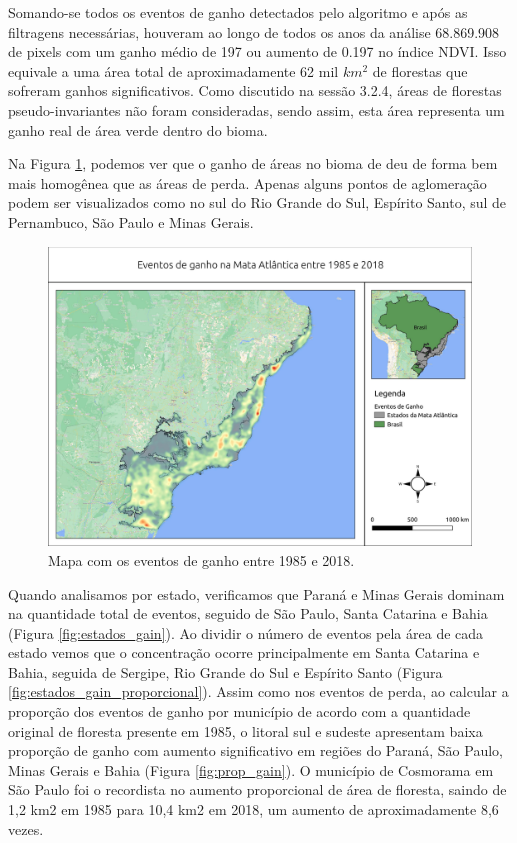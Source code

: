 \hspace{13pt} Somando-se todos os eventos de ganho detectados pelo algoritmo e após as filtragens necessárias, houveram ao longo de todos os anos da análise 68.869.908 de pixels com um ganho médio de 197 ou aumento de 0.197 no índice NDVI. Isso equivale a uma área total de aproximadamente 62 mil $ km^2 $ de florestas que sofreram ganhos significativos. Como discutido na sessão 3.2.4, áreas de florestas pseudo-invariantes não foram consideradas, sendo assim, esta área representa um ganho real de área verde dentro do bioma. 

Na Figura \ref{fig:heat_gain}, podemos ver que o ganho de áreas no bioma de deu de forma bem mais homogênea que as áreas de perda. Apenas alguns pontos de aglomeração podem ser visualizados como no sul do Rio Grande do Sul, Espírito Santo, sul de Pernambuco, São Paulo e Minas Gerais.

\begin{figure}[H]
    \centering
    \includegraphics[scale=.5]{images/heatmap_gain_masked18_dur_gt4_inv_for.pdf}
    \caption{Mapa com os eventos de ganho entre 1985 e 2018.}
    \label{fig:heat_gain}
\end{figure}

Quando analisamos por estado, verificamos que Paraná e Minas Gerais dominam na quantidade total de eventos, seguido de São Paulo, Santa Catarina e Bahia (Figura \ref{fig:estados_gain}). Ao dividir o número de eventos pela área de cada estado vemos que o concentração ocorre principalmente em Santa Catarina e Bahia, seguida de Sergipe, Rio Grande do Sul e Espírito Santo (Figura \ref{fig:estados_gain_proporcional}). Assim como nos eventos de perda, ao calcular a proporção dos eventos de ganho por município de acordo com a quantidade original de floresta presente em 1985, o litoral sul e sudeste apresentam baixa proporção de ganho com aumento significativo em regiões do Paraná, São Paulo, Minas Gerais e Bahia (Figura \ref{fig:prop_gain}). O município de Cosmorama em São Paulo foi o recordista no aumento proporcional de área de floresta, saindo de 1,2 km2 em 1985 para 10,4 km2 em 2018, um aumento de aproximadamente 8,6 vezes.


